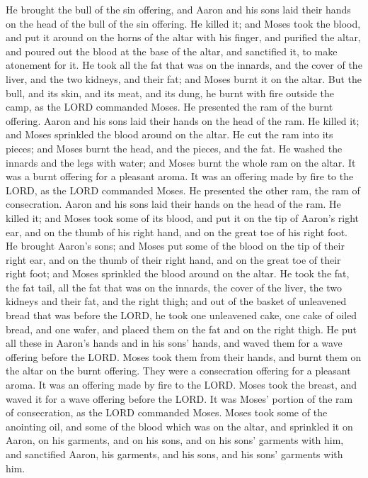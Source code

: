  He brought the bull of the sin offering, and Aaron and his
sons laid their hands on the head of the bull of the sin offering.
 He killed it; and Moses took the blood, and put it around
on the horns of the altar with his finger, and purified the altar, and
poured out the blood at the base of the altar, and sanctified it, to
make atonement for it.  He took all the fat that was on the
innards, and the cover of the liver, and the two kidneys, and their fat;
and Moses burnt it on the altar.  But the bull, and its
skin, and its meat, and its dung, he burnt with fire outside the camp,
as the LORD commanded Moses.  He presented the ram of the
burnt offering. Aaron and his sons laid their hands on the head of the
ram.  He killed it; and Moses sprinkled the blood around on
the altar.  He cut the ram into its pieces; and Moses burnt
the head, and the pieces, and the fat.  He washed the
innards and the legs with water; and Moses burnt the whole ram on the
altar. It was a burnt offering for a pleasant aroma. It was an offering
made by fire to the LORD, as the LORD commanded Moses.  He
presented the other ram, the ram of consecration. Aaron and his sons
laid their hands on the head of the ram.  He killed it; and
Moses took some of its blood, and put it on the tip of Aaron's right
ear, and on the thumb of his right hand, and on the great toe of his
right foot.  He brought Aaron's sons; and Moses put some of
the blood on the tip of their right ear, and on the thumb of their right
hand, and on the great toe of their right foot; and Moses sprinkled the
blood around on the altar.  He took the fat, the fat tail,
all the fat that was on the innards, the cover of the liver, the two
kidneys and their fat, and the right thigh;  and out of the
basket of unleavened bread that was before the LORD, he took one
unleavened cake, one cake of oiled bread, and one wafer, and placed them
on the fat and on the right thigh.  He put all these in
Aaron's hands and in his sons' hands, and waved them for a wave offering
before the LORD.  Moses took them from their hands, and
burnt them on the altar on the burnt offering. They were a consecration
offering for a pleasant aroma. It was an offering made by fire to the
LORD.  Moses took the breast, and waved it for a wave
offering before the LORD. It was Moses' portion of the ram of
consecration, as the LORD commanded Moses.  Moses took some
of the anointing oil, and some of the blood which was on the altar, and
sprinkled it on Aaron, on his garments, and on his sons, and on his
sons' garments with him, and sanctified Aaron, his garments, and his
sons, and his sons' garments with him.

